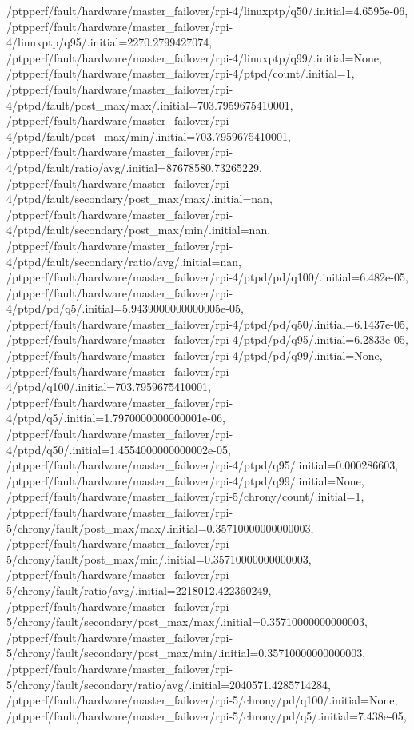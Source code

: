 {    /ptpperf/fault/hardware/master_failover/rpi-4/linuxptp/q50/.initial=4.6595e-06,
    /ptpperf/fault/hardware/master_failover/rpi-4/linuxptp/q95/.initial=2270.2799427074,
    /ptpperf/fault/hardware/master_failover/rpi-4/linuxptp/q99/.initial=None,
    /ptpperf/fault/hardware/master_failover/rpi-4/ptpd/count/.initial=1,
    /ptpperf/fault/hardware/master_failover/rpi-4/ptpd/fault/post_max/max/.initial=703.7959675410001,
    /ptpperf/fault/hardware/master_failover/rpi-4/ptpd/fault/post_max/min/.initial=703.7959675410001,
    /ptpperf/fault/hardware/master_failover/rpi-4/ptpd/fault/ratio/avg/.initial=87678580.73265229,
    /ptpperf/fault/hardware/master_failover/rpi-4/ptpd/fault/secondary/post_max/max/.initial=nan,
    /ptpperf/fault/hardware/master_failover/rpi-4/ptpd/fault/secondary/post_max/min/.initial=nan,
    /ptpperf/fault/hardware/master_failover/rpi-4/ptpd/fault/secondary/ratio/avg/.initial=nan,
    /ptpperf/fault/hardware/master_failover/rpi-4/ptpd/pd/q100/.initial=6.482e-05,
    /ptpperf/fault/hardware/master_failover/rpi-4/ptpd/pd/q5/.initial=5.9439000000000005e-05,
    /ptpperf/fault/hardware/master_failover/rpi-4/ptpd/pd/q50/.initial=6.1437e-05,
    /ptpperf/fault/hardware/master_failover/rpi-4/ptpd/pd/q95/.initial=6.2833e-05,
    /ptpperf/fault/hardware/master_failover/rpi-4/ptpd/pd/q99/.initial=None,
    /ptpperf/fault/hardware/master_failover/rpi-4/ptpd/q100/.initial=703.7959675410001,
    /ptpperf/fault/hardware/master_failover/rpi-4/ptpd/q5/.initial=1.7970000000000001e-06,
    /ptpperf/fault/hardware/master_failover/rpi-4/ptpd/q50/.initial=1.4554000000000002e-05,
    /ptpperf/fault/hardware/master_failover/rpi-4/ptpd/q95/.initial=0.000286603,
    /ptpperf/fault/hardware/master_failover/rpi-4/ptpd/q99/.initial=None,
    /ptpperf/fault/hardware/master_failover/rpi-5/chrony/count/.initial=1,
    /ptpperf/fault/hardware/master_failover/rpi-5/chrony/fault/post_max/max/.initial=0.35710000000000003,
    /ptpperf/fault/hardware/master_failover/rpi-5/chrony/fault/post_max/min/.initial=0.35710000000000003,
    /ptpperf/fault/hardware/master_failover/rpi-5/chrony/fault/ratio/avg/.initial=2218012.422360249,
    /ptpperf/fault/hardware/master_failover/rpi-5/chrony/fault/secondary/post_max/max/.initial=0.35710000000000003,
    /ptpperf/fault/hardware/master_failover/rpi-5/chrony/fault/secondary/post_max/min/.initial=0.35710000000000003,
    /ptpperf/fault/hardware/master_failover/rpi-5/chrony/fault/secondary/ratio/avg/.initial=2040571.4285714284,
    /ptpperf/fault/hardware/master_failover/rpi-5/chrony/pd/q100/.initial=None,
    /ptpperf/fault/hardware/master_failover/rpi-5/chrony/pd/q5/.initial=7.438e-05,
}
